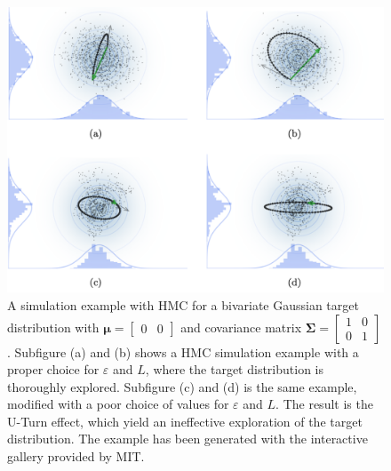 \begin{figure}[h!]
    \centering
    \includegraphics[width=\textwidth]{pics/HMC_Example.png}
    \caption{A simulation example with HMC for a bivariate Gaussian target distribution with $\boldsymbol{\mu}= \begin{bmatrix}
            0 & 0
            \end{bmatrix}$ and covariance matrix
            $\boldsymbol{\Sigma}= 
            \begin{bmatrix}
                1 & 0\\
                0 & 1   
            \end{bmatrix}$. Subfigure (a) and (b) shows a HMC simulation example with a proper choice for $\varepsilon$ and $L$, where the target distribution is thoroughly explored. Subfigure (c) and (d) is the same example, modified with a poor choice of values for $\varepsilon$ and $L$. The result is the U-Turn effect, which yield an ineffective exploration of the target distribution. The example has been generated with the interactive gallery provided by \cite{feng} \textcopyright MIT.}
    \label{fig:HMC_Example}
\end{figure}



